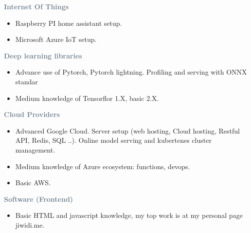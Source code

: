 


\divider


\divider




\textcolor{SlateGrey}{\textbf{Internet Of Things}}
\newline

\begin{itemize}
    \item Raspberry PI home assistant setup.
    \item Microsoft Azure IoT setup.
\end{itemize}

\textcolor{SlateGrey}{\textbf{Deep learning libraries}}
\newline

\begin{itemize}
    \item Advance use of Pytorch, Pytorch lightning. Profiling and serving with ONNX standar
    \item Medium knowledge of Tensorflor 1.X, basic 2.X.
\end{itemize}

\textcolor{SlateGrey}{\textbf{Cloud Providers}}
\newline

\begin{itemize}
    \item Advanced Google Cloud. Server setup (web hosting, Cloud hosting, Restful API, Redis, SQL ..). Online model serving and kubertenes cluster management.
    \item Medium knowledge of Azure ecosystem: functions, devops.
    \item Basic AWS.
\end{itemize}

\textcolor{SlateGrey}{\textbf{Software (Frontend)}}
\newline

\begin{itemize}
    \item Basic HTML and javascript knowledge, my top work is at my personal page jiwidi.me.
\end{itemize}





